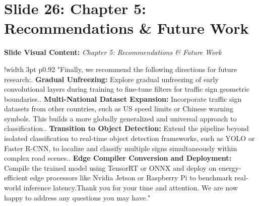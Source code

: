 \documentclass[11pt]{article}
\begin{document}
\section{Slide 26: Chapter 5: Recommendations \& Future Work}
\textbf{Slide Visual Content:} \textit{Chapter 5: Recommendations \& Future Work}\\ [8pt]
\noindent
\begin{tabular}{!{\color{primary}\vrule width 3pt} p{0.92\textwidth}}
  \small\color{black!80} "Finally, we recommend the following directions for future research:\newline{}.  \textbf{Gradual Unfreezing:} Explore gradual unfreezing of early convolutional layers during training to fine-tune filters for traffic sign geometric boundaries.\newline{}.  \textbf{Multi-National Dataset Expansion:} Incorporate traffic sign datasets from other countries, such as US speed limits or Chinese warning symbols. This builds a more globally generalized and universal approach to classification.\newline{}.  \textbf{Transition to Object Detection:} Extend the pipeline beyond isolated classification to real-time object detection frameworks, such as YOLO or Faster R-CNN, to localize and classify multiple signs simultaneously within complex road scenes.\newline{}.  \textbf{Edge Compiler Conversion and Deployment:} Compile the trained model using TensorRT or ONNX and deploy on energy-efficient edge processors like Nvidia Jetson or Raspberry Pi to benchmark real-world inference latency.\newline\newline Thank you for your time and attention. We are now happy to address any questions you may have."
\end{tabular}
\vspace{15pt}
\end{document}
